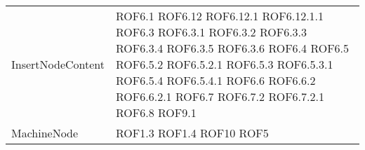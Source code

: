 \begin{longtable}{p{5cm}!{\VRule[1pt]}p{2.5cm}}
	InsertNodeContent & ROF6.1 \newline ROF6.12 \newline ROF6.12.1 \newline ROF6.12.1.1 \newline ROF6.3 \newline ROF6.3.1 \newline ROF6.3.2 \newline ROF6.3.3 \newline ROF6.3.4 \newline ROF6.3.5 \newline ROF6.3.6 \newline ROF6.4 \newline ROF6.5 \newline ROF6.5.2 \newline ROF6.5.2.1 \newline ROF6.5.3 \newline ROF6.5.3.1 \newline ROF6.5.4 \newline ROF6.5.4.1 \newline ROF6.6 \newline ROF6.6.2 \newline ROF6.6.2.1 \newline ROF6.7 \newline ROF6.7.2 \newline ROF6.7.2.1 \newline ROF6.8 \newline ROF9.1\\
	MachineNode & ROF1.3 \newline ROF1.4 \newline ROF10 \newline ROF5\\

\end{longtable}
